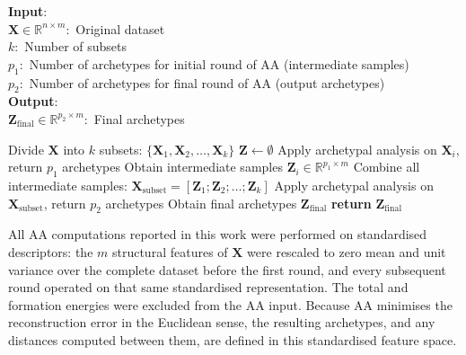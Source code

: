 \documentclass{WileyMSP-template}
\newcommand{\revision}[1]{{\color{red}#1}}
\begin{document}
\begin{algorithm}
\caption{Pseudocode of iterative archetypal analysis algorithm.}
\label{alg:redRedIAA}
\begin{flushleft}
    \textbf{Input}: \\
    \hspace*{\algorithmicindent} $\mathbf{X} \in \mathbb{R}^{n \times m}:$ Original dataset \\
    \hspace*{\algorithmicindent} $k:$ Number of subsets \\
    \hspace*{\algorithmicindent} $p_1:$ Number of archetypes for initial round of AA (intermediate samples) \\
    \hspace*{\algorithmicindent} $p_2:$ Number of archetypes for final round of AA (output archetypes) \\
    \textbf{Output}: \\
    \hspace*{\algorithmicindent} $\mathbf{Z}_{\mathrm{final}} \in \mathbb{R}^{p_2 \times m}:$ Final archetypes
\end{flushleft}
\begin{algorithmic}[1]
        \State Divide $\mathbf{X}$ into $k$ subsets: $\{\mathbf{X}_1, \mathbf{X}_2, \ldots, \mathbf{X}_k\}$
        \State $\mathbf{Z} \gets \emptyset$
            \State Apply archetypal analysis on $\mathbf{X}_i$, return $p_1$ archetypes
            \State Obtain intermediate samples $\mathbf{Z}_i \in \mathbb{R}^{p_1 \times m}$
        \EndFor
        \State Combine all intermediate samples: $\mathbf{X}_{\mathrm{subset}} = [\mathbf{Z}_1; \mathbf{Z}_2; \ldots; \mathbf{Z}_k]$
        \State Apply archetypal analysis on $\mathbf{X}_{\mathrm{subset}}$, return $p_2$ archetypes
        \State Obtain final archetypes $\mathbf{Z}_{\mathrm{final}}$
        \State \textbf{return} $\mathbf{Z}_{\mathrm{final}}$
    \EndProcedure
\end{algorithmic}
\end{algorithm}

\revision{All AA computations reported in this work were performed on standardised descriptors: the $m$ structural features of $\mathbf{X}$ were rescaled to zero mean and unit variance over the complete dataset before the first round, and every subsequent round operated on that same standardised representation. The total and formation energies were excluded from the AA input. Because AA minimises the reconstruction error in the Euclidean sense, the resulting archetypes, and any distances computed between them, are defined in this standardised feature space.}
\end{document}

